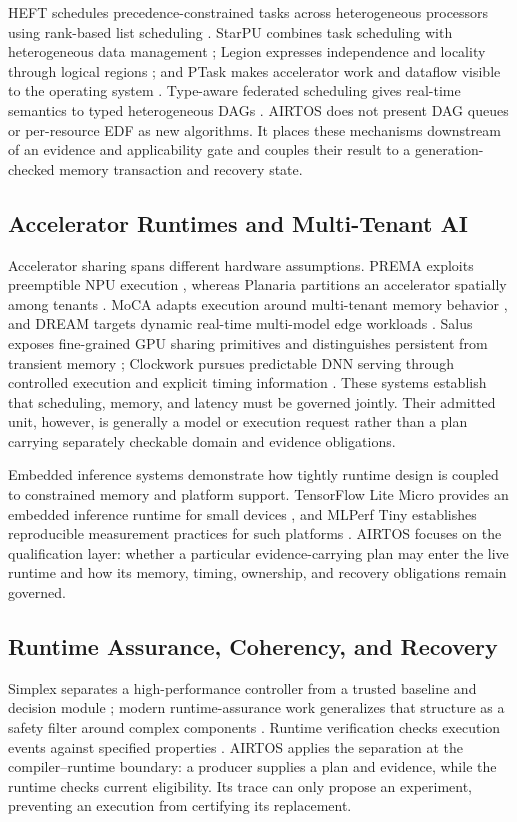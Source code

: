 \documentclass[lettersize,journal]{IEEEtran}
\begin{document}
HEFT schedules precedence-constrained tasks across heterogeneous processors
using rank-based list scheduling \cite{topcuoglu2002performanceeffective}.
StarPU combines task scheduling with heterogeneous data management
\cite{augonnet2011starpu}; Legion expresses independence and locality through
logical regions \cite{bauer2012legion}; and PTask makes accelerator work and
dataflow visible to the operating system \cite{rossbach2011ptask}. Type-aware
federated scheduling gives real-time semantics to typed heterogeneous DAGs
\cite{lin2022typeaware}. AIRTOS does not present DAG queues or per-resource EDF
as new algorithms. It places these mechanisms downstream of an evidence and
applicability gate and couples their result to a generation-checked memory
transaction and recovery state.

\subsection{Accelerator Runtimes and Multi-Tenant AI}
Accelerator sharing spans different hardware assumptions. PREMA exploits
preemptible NPU execution \cite{choi2020prema}, whereas Planaria partitions an
accelerator spatially among tenants \cite{ghodrati2020planaria}. MoCA adapts
execution around multi-tenant memory behavior \cite{kim2023moca}, and DREAM
targets dynamic real-time multi-model edge workloads \cite{kim2023dream}.
Salus exposes fine-grained GPU sharing primitives and distinguishes persistent
from transient memory \cite{yu2019salus}; Clockwork pursues predictable DNN
serving through controlled execution and explicit timing information
\cite{gujarati2020serving}. These systems establish that scheduling, memory,
and latency must be governed jointly. Their admitted unit, however, is
generally a model or execution request rather than a plan carrying separately
checkable domain and evidence obligations.

Embedded inference systems demonstrate how tightly runtime design is coupled
to constrained memory and platform support. TensorFlow Lite Micro provides an
embedded inference runtime for small devices \cite{david2021tensorflow}, and
MLPerf Tiny establishes reproducible measurement practices for such platforms
\cite{banbury2021mlperf}. AIRTOS focuses on the qualification layer: whether a
particular evidence-carrying plan may enter the live runtime and how its
memory, timing, ownership, and recovery obligations remain governed.

\subsection{Runtime Assurance, Coherency, and Recovery}
Simplex separates a high-performance controller from a trusted baseline and
decision module \cite{seto1998simplex}; modern runtime-assurance work
generalizes that structure as a safety filter around complex components
\cite{hobbs2023runtime}. Runtime verification checks execution events against
specified properties \cite{leucker2009brief}. AIRTOS applies the separation at
the compiler--runtime boundary: a producer supplies a plan and evidence, while
the runtime checks current eligibility. Its trace can only propose an
experiment, preventing an execution from certifying its replacement.
\end{document}
